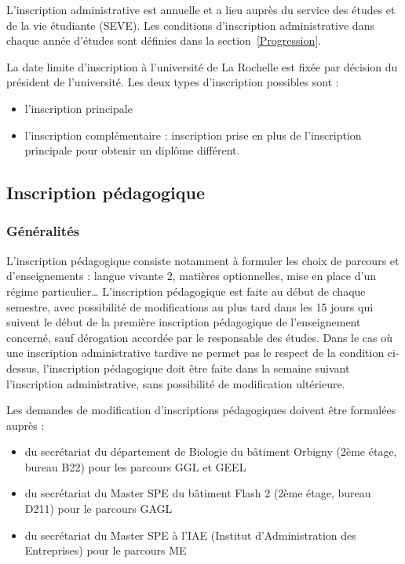 \documentclass[a4paper,11pt]{article}
\begin{document}
L'inscription administrative est annuelle et a lieu auprès du service des études et de la vie étudiante (SEVE). Les conditions d'inscription administrative dans chaque année d'études sont définies dans la section~\ref{Progression}.

La date limite d'inscription à l'université de La Rochelle est fixée par décision du président de l'université.
Les deux types d'inscription possibles sont :
\begin{itemize}
\item l'inscription principale
\item l'inscription complémentaire : inscription prise en plus de l'inscription principale pour obtenir un diplôme différent.
\end{itemize}


\subsection{Inscription pédagogique}\label{InscriptionPeda}

\subsubsection{Généralités}

L'inscription pédagogique consiste notamment à formuler les choix de parcours et d'enseignements : langue vivante 2, matières optionnelles, mise en place d'un régime particulier\ldots{} 
L'inscription pédagogique est faite au début de chaque semestre, avec possibilité de modifications au plus tard dans les 15 jours qui suivent le début de la première inscription pédagogique de l'enseignement concerné, sauf dérogation accordée par le responsable des études.
Dans le cas où une inscription administrative tardive ne permet pas le respect de la condition ci-dessus, l'inscription pédagogique doit être faite dans la semaine suivant l'inscription administrative, sans possibilité de modification ultérieure.

Les demandes de modification d'inscriptions pédagogiques doivent être formulées auprès :
\begin{itemize}
\item du secrétariat du département de Biologie du bâtiment Orbigny (2ème étage, bureau B22) pour les parcours GGL et GEEL
\item du secrétariat du Master SPE du bâtiment Flash 2 (2ème étage, bureau D211) pour le parcours GAGL
\item du secrétariat du Master SPE à l'IAE (Institut d'Administration des Entreprises) pour le parcours ME
\end{itemize}
\end{document}

